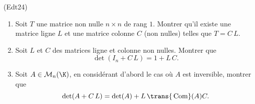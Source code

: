 \begin{tiny}(Edt24)\end{tiny}
\begin{enumerate}
 \item Soit $T$ une matrice non nulle $n\times n$ de rang $1$. Montrer qu'il existe une matrice ligne $L$ et une matrice colonne $C$ (non nulles) telles que $T = C\, L$.
 \item Soit $L$ et $C$ des matrices ligne et colonne non nulles. Montrer que
 \[
  \det(I_n + C\,L) = 1 + L\,C.
 \]
 \item Soit $A\in \mathcal{M}_n(\K)$, en considérant d'abord le cas où $A$ est inversible, montrer que
 \[
  \det(A + C\,L) = \det(A) + L\, \trans{\,\mathop{\mathrm{Com }}}(A) C.
 \]

\end{enumerate}
